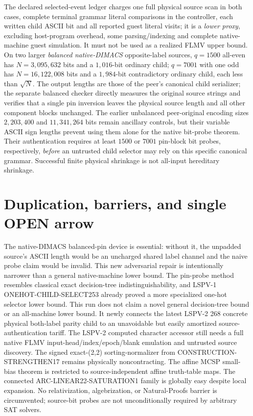 \documentclass[11pt]{article}
\begin{document}
The declared selected-event ledger charges one full physical source scan in both cases, complete terminal grammar literal comparisons in the controller, each written child ASCII bit and all reported guest literal visits; it is a \emph{lower proxy}, excluding host-program overhead, some parsing/indexing and complete native-machine guest simulation. It must not be used as a realized FLMV upper bound. On two larger \emph{balanced native-DIMACS} opposite-label sources, $q=1500$ all-even has $N=3{,}095{,}632$ bits and a $1{,}016$-bit ordinary child; $q=7001$ with one odd has $N=16{,}122{,}008$ bits and a $1{,}984$-bit contradictory ordinary child, each less than $\sqrt N$. The output lengths are those of the peer's canonical child serializer; the separate balanced checker directly measures the original source strings and verifies that a single pin inversion leaves the physical source length and all other component blocks unchanged. The earlier unbalanced peer-original encoding sizes $2{,}203{,}400$ and $11{,}341{,}264$ bits remain ancillary controls, but their variable ASCII sign lengths prevent using them alone for the native bit-probe theorem. Their authentication requires at least $1500$ or $7001$ pin-block bit probes, respectively, \emph{before} an untrusted child selector may rely on this specific canonical grammar. Successful finite physical shrinkage is not all-input hereditary shrinkage.

\section{Duplication, barriers, and single OPEN arrow}
The native-DIMACS balanced-pin device is essential: without it, the unpadded source's ASCII length would be an uncharged shared label channel and the naive probe claim would be invalid. This new adversarial repair is intentionally narrower than a general native-machine lower bound. The pin-probe method resembles classical exact decision-tree indistinguishability, and LSPV-1 ONEHOT-CHILD-SELECT253 already proved a more specialized one-hot selector lower bound. This run does not claim a novel general decision-tree bound or an all-machine lower bound. It newly connects the latest LSPV-2 268 concrete physical both-label parity child to an unavoidable but easily amortized source-authentication tariff. The LSPV-2 computed character accessor still needs a full native FLMV input-head/index/epoch/blank emulation and untrusted source discovery. The signed exact-(2,2) sorting-normalizer from CONSTRUCTION-STRENGTHEN17 remains physically noncontracting. The affine MCSP small-bias theorem is restricted to source-independent affine truth-table maps. The connected ARC-LINEAR22-SATURATION1 family is globally easy despite local expansion. No relativization, algebrization, or Natural-Proofs barrier is circumvented; source-bit probes are not unconditionally required by arbitrary SAT solvers.
\end{document}
